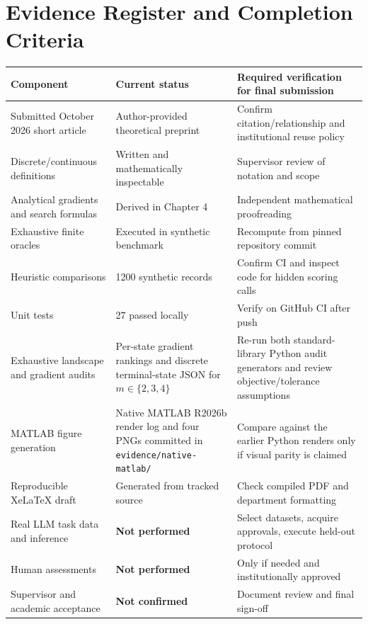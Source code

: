 \documentclass[12pt,a4paper,oneside]{report}
\begin{document}
\chapter{Evidence Register and Completion Criteria}
\small
\begin{longtable}{p{}p{}p{}}
\toprule Component&Current status&Required verification for final submission\\\midrule\endhead
Submitted October 2026 short article&Author-provided theoretical preprint&Confirm citation/relationship and institutional reuse policy\\
Discrete/continuous definitions&Written and mathematically inspectable&Supervisor review of notation and scope\\
Analytical gradients and search formulas&Derived in Chapter 4&Independent mathematical proofreading\\
Exhaustive finite oracles&Executed in synthetic benchmark&Recompute from pinned repository commit\\
Heuristic comparisons&1200 synthetic records&Confirm CI and inspect code for hidden scoring calls\\
Unit tests&27 passed locally&Verify on GitHub CI after push\\
Exhaustive landscape and gradient audits&Per-state gradient rankings and discrete terminal-state JSON for $m\in\{2,3,4\}$&Re-run both standard-library Python audit generators and review objective/tolerance assumptions\\
MATLAB figure generation&Native MATLAB R2026b render log and four PNGs committed in \texttt{evidence/native-matlab/}&Compare against the earlier Python renders only if visual parity is claimed\\
Reproducible XeLaTeX draft&Generated from tracked source&Check compiled PDF and department formatting\\
Real LLM task data and inference&\textbf{Not performed}&Select datasets, acquire approvals, execute held-out protocol\\
Human assessments&\textbf{Not performed}&Only if needed and institutionally approved\\
Supervisor and academic acceptance&\textbf{Not confirmed}&Document review and final sign-off\\\bottomrule
\end{longtable}
\normalsize
\end{document}
